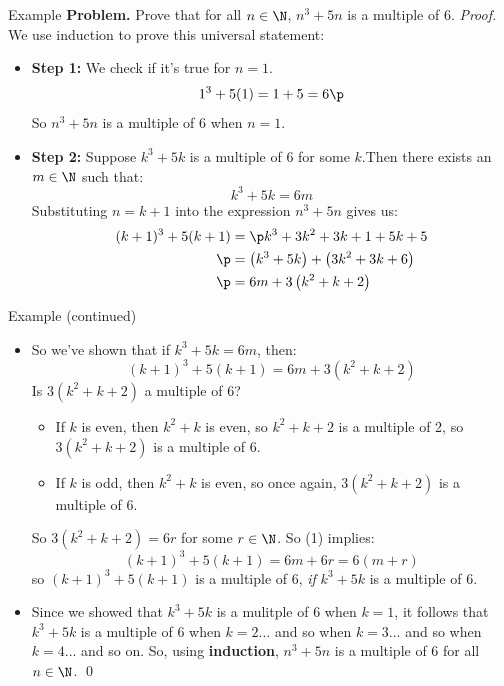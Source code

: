 \documentclass[11pt,aspectratio=1610,handout]{beamer}
\begin{document}
	
	\begin{frame}{Example}
		\textbf{Problem.} Prove that for all $n \in \N$, $n^3 + 5n$ is a multiple of 6. \p
		\newline\newline
		\emph{Proof.} We use induction to prove this universal statement: \p
		\begin{itemize}
			\item \textbf{Step 1:} We check if it's true for $n=1$. \p
			\[
			1^3 + 5(1) = 1 + 5 = 6 \p
			\]
			So $n^3 + 5n$ is a multiple of 6 when $n=1$. \p
			\item \textbf{Step 2:} Suppose $k^3 + 5k$ is a multiple of 6 for some $k$.\p  Then there exists an $m \in \N$ such that: 
			\[
			k^3 + 5k = 6m
			\]\p
			Substituting $n=k+1$ into the expression $n^3 + 5n$ gives us: 
			\begin{align*}
			(k+1)^3 + 5(k+1) &= \p k^3 + 3k^2 + 3k + 1 + 5k + 5 \\\p
			&= \left(k^3 + 5k\right) + \left( 3k^2 + 3k + 6\right) \\ \p
			&= 6m + 3\left(k^2 + k + 2\right) 
			\end{align*}
		\end{itemize}
	\end{frame}
	
	\begin{frame}{Example (continued)}
		\begin{itemize}
			\item So we've shown that if $k^3 + 5k = 6m$, then: 
			\begin{equation}
			(k+1)^3 + 5(k+1) = 6m + 3\left(k^2 + k + 2\right)
			\end{equation}\p
			Is $3\left(k^2 + k + 2\right)$ a multiple of 6? \p
			\begin{itemize}
				\item If $k$ is even, then $k^2 + k$ is even, so $k^2 + k + 2$ is a multiple of 2, so $3(k^2 + k + 2)$ is a multiple of 6. 
				\item If $k$ is odd, then $k^2 + k$ is even, so once again, $3(k^2 + k + 2)$ is a multiple of 6. 
			\end{itemize} \p
			So $3(k^2 + k + 2) = 6r$ for some $r \in \N$. So (1) implies:
			\[
			(k+1)^3 + 5(k+1) = 6m + 6r = 6(m+r)
			\]\p
			so $(k+1)^3 + 5(k+1)$ is a multiple of 6, \emph{if} $k^3 + 5k$ is a multiple of 6. \p
			\item Since we showed that $k^3 + 5k$ is a mulitple of 6 when $k=1$, it follows that $k^3 + 5k$ is a multiple of 6 when $k=2$... and so when $k=3$... and so when $k=4$... and so on. \p So, using \textbf{induction}, $n^3 + 5n$ is a multiple of 6 for all $n \in \N$. \qed
		\end{itemize}
	\end{frame}
\end{document}
